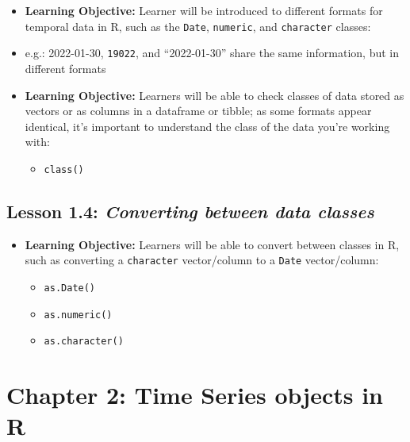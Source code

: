 \documentclass[
]{book}
\providecommand{\tightlist}{%
  \setlength{\itemsep}{0pt}\setlength{\parskip}{0pt}}
\begin{document}
\begin{itemize}
\tightlist
\item
  \textbf{Learning Objective:} Learner will be introduced to different formats for temporal data in R, such as the \texttt{Date}, \texttt{numeric}, and \texttt{character} classes:
\item
  e.g.: 2022-01-30, \texttt{19022}, and ``2022-01-30'' share the same information, but in different formats
\item
  \textbf{Learning Objective:} Learners will be able to check classes of data stored as vectors or as columns in a dataframe or tibble; as some formats appear identical, it's important to understand the class of the data you're working with:

  \begin{itemize}
  \tightlist
  \item
    \texttt{class()}
  \end{itemize}
\end{itemize}

\hypertarget{lesson-1.4-converting-between-data-classes}{%
\subsection*{\texorpdfstring{Lesson 1.4: \emph{Converting between data classes}}{Lesson 1.4: Converting between data classes}}\label{lesson-1.4-converting-between-data-classes}}

\begin{itemize}
\tightlist
\item
  \textbf{Learning Objective:} Learners will be able to convert between classes in R, such as converting a \texttt{character} vector/column to a \texttt{Date} vector/column:

  \begin{itemize}
  \tightlist
  \item
    \texttt{as.Date()}
  \item
    \texttt{as.numeric()}
  \item
    \texttt{as.character()}
  \end{itemize}
\end{itemize}

\hypertarget{chapter-2-time-series-objects-in-r}{%
\section*{Chapter 2: Time Series objects in R}\label{chapter-2-time-series-objects-in-r}}
\end{document}
